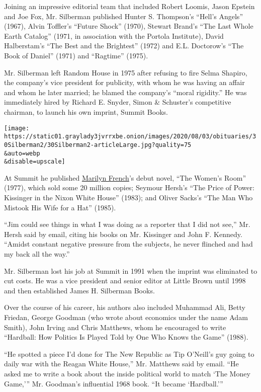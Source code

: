 Joining an impressive editorial team that included Robert Loomis, Jason
Epstein and Joe Fox, Mr. Silberman published Hunter S. Thompson's
``Hell's Angels'' (1967), Alvin Toffler's ``Future Shock'' (1970),
Stewart Brand's ``The Last Whole Earth Catalog'' (1971, in association
with the Portola Institute), David Halberstam's ``The Best and the
Brightest'' (1972) and E.L. Doctorow's ``The Book of Daniel'' (1971) and
``Ragtime'' (1975).

Mr. Silberman left Random House in 1975 after refusing to fire Selma
Shapiro, the company's vice president for publicity, with whom he was
having an affair and whom he later married; he blamed the company's
``moral rigidity.'' He was immediately hired by Richard E. Snyder, Simon
\& Schuster's competitive chairman, to launch his own imprint, Summit
Books.

\texttt{[image: https://static01.graylady3jvrrxbe.onion/images/2020/08/03/obituaries/30Silberman2/30Silberman2-articleLarge.jpg?quality=75\\\&auto=webp\\\&disable=upscale]}

At Summit he published
\href{https://www.nytimes3xbfgragh.onion/2009/05/04/arts/04french.html}{Marilyn
French}'s debut novel, ``The Women's Room'' (1977), which sold some 20
million copies; Seymour Hersh's ``The Price of Power: Kissinger in the
Nixon White House'' (1983); and Oliver Sacks's ``The Man Who Mistook His
Wife for a Hat'' (1985).

``Jim could see things in what I was doing as a reporter that I did not
see,'' Mr. Hersh said by email, citing his books on Mr. Kissinger and
John F. Kennedy. ``Amidst constant negative pressure from the subjects,
he never flinched and had my back all the way.''

Mr. Silberman lost his job at Summit in 1991 when the imprint was
eliminated to cut costs. He was a vice president and senior editor at
Little Brown until 1998 and then established James H. Silberman Books.

Over the course of his career, his authors also included Muhammad Ali,
Betty Friedan, George Goodman (who wrote about economics under the name
Adam Smith), John Irving and Chris Matthews, whom he encouraged to write
``Hardball: How Politics Is Played Told by One Who Knows the Game''
(1988).

``He spotted a piece I'd done for The New Republic as Tip O'Neill's guy
going to daily war with the Reagan White House,'' Mr. Matthews said by
email. ``He asked me to write a book about the inside political world to
match `The Money Game,''' Mr. Goodman's influential 1968 book. ``It
became `Hardball.'''


